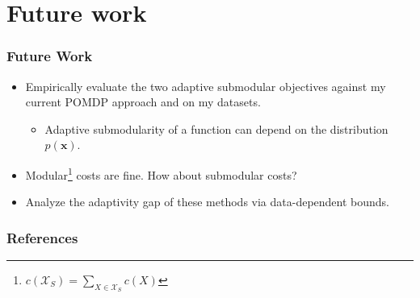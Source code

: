 \documentclass[handout]{beamer}
\begin{document}
\section{Future work}

\begin{frame}\frametitle{Future Work}
\begin{itemize}
    \item Empirically evaluate the two adaptive submodular objectives against my current POMDP approach and on my datasets.
    \begin{itemize}
        \item Adaptive submodularity of a function can depend on the distribution $p(\mathbf{x})$.
    \end{itemize}
    \pause
    \item Modular\footnote{$c(\mathcal{X}_S) = \sum_{X \in \mathcal{X}_S} c(X)$} costs are fine. How about submodular costs?
    \pause
    \item Analyze the adaptivity gap of these methods via data-dependent bounds.
\end{itemize}
\end{frame}

\begin{frame}
\frametitle{References}
\small{}
\end{frame}
\end{document}
